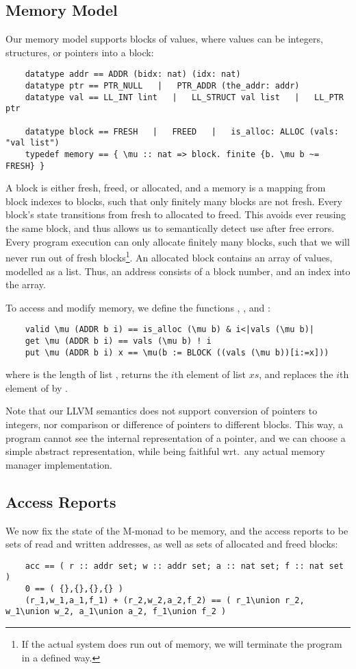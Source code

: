 \documentclass[a4paper,UKenglish,cleveref, autoref, thm-restate]{lipics-v2021}
\begin{document}
  \subsection{Memory Model}
  Our memory model supports blocks of values, where values can be integers, structures, or pointers into a block:
  \begin{lstlisting}
    datatype addr == ADDR (bidx: nat) (idx: nat)
    datatype ptr == PTR_NULL   |   PTR_ADDR (the_addr: addr)
    datatype val == LL_INT lint   |   LL_STRUCT val list   |   LL_PTR ptr

    datatype block == FRESH   |   FREED   |   is_alloc: ALLOC (vals: "val list")
    typedef memory == { \mu :: nat => block. finite {b. \mu b ~= FRESH} }
  \end{lstlisting}
  A block is either fresh, freed, or allocated, and a memory is a mapping from block indexes to blocks,
  such that only finitely many blocks are not fresh. Every block's state transitions from fresh to
  allocated to freed. This avoids ever reusing the same block, and thus allows us to semantically detect use after free errors.
  Every program execution can only allocate finitely many blocks,
  such that we will never run out of fresh blocks\footnote{If the actual system does run out of memory, we will terminate the program in a defined way.}.
  An allocated block contains an array of values, modelled as a list. Thus, an address consists of a block number, and an index into the array.

  To access and modify memory, we define the functions , , and :
  \begin{lstlisting}
    valid \mu (ADDR b i) == is_alloc (\mu b) & i<|vals (\mu b)|
    get \mu (ADDR b i) == vals (\mu b) ! i
    put \mu (ADDR b i) x == \mu(b := BLOCK ((vals (\mu b))[i:=x]))
  \end{lstlisting}
  where  is the length of list ,  returns the \is$i$th element of list \is$xs$,
  and  replaces the \is$i$th element of  by .

  Note that our LLVM semantics does not support conversion of pointers to integers, nor comparison
  or difference of pointers to different blocks. This way, a program cannot see the internal representation of a pointer,
  and we can choose a simple abstract representation, while being
  faithful wrt.\ any actual memory manager implementation.

  \subsection{Access Reports}
  We now fix the state of the M-monad to be memory, and the access reports to be sets
  of read and written addresses, as well as sets of allocated and freed blocks:
  \begin{lstlisting}
    acc == ( r :: addr set; w :: addr set; a :: nat set; f :: nat set )
    0 == ( {},{},{},{} )
    (r_1,w_1,a_1,f_1) + (r_2,w_2,a_2,f_2) == ( r_1\union r_2, w_1\union w_2, a_1\union a_2, f_1\union f_2 )
  \end{lstlisting}
\end{document}
